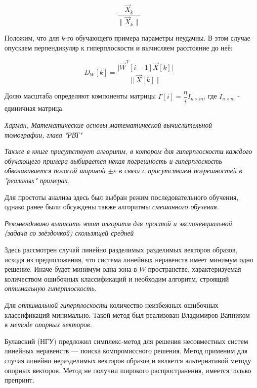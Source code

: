 \documentclass[a4paper]{article}
\numberwithin{equation}{subsection}
\begin{document}
\begin{equation}
    \dfrac{\vec{X}_k}{\| \vec{X}_k \|}
\end{equation}

Положим, что для $k$-го обучающего примера параметры неудачны. В этом случае опускаем перпендикуляр
к гиперплоскости и вычисляем расстояние до неё:

\begin{equation}
    D_W [k] = \dfrac{\lvert \vec{W}^T [i-1] \vec{X}[k] \rvert}{\| \vec{X}[k] \|}
\end{equation}

Долю масштаба определяют компоненты матрицы $\Gamma[i]=\dfrac{\eta}{i} I_{n\times m}$, где $I_{n \times m}$ - единичная матрица.

\begin{myquote}
    \textit{Харман, Математические основы математической вычислительной томографии, глава "РВТ"}
\end{myquote}

\begin{myquote}
    \textit{Также в книге присутствует алгоритм, в котором для гиперплоскости каждого обучающего 
    примера выбирается некая погрешность и гиперплоскость обволакивается полосой
    шириной $\pm \varepsilon$ в связи с присутствием погрешностей в "реальных" примерах.}
\end{myquote}

Для простоты анализа здесь был выбран режим последовательного обучения, однако ранее были обсуждены 
также алгоритмы
\textit{смешанного обучения}.

\begin{myquote}
    \textit{Рекомендовано выписать этот алгоритм для простой и экспоненциальной (задача со звёздочкой) 
    скользящей средней}
\end{myquote}

Здесь рассмотрен случай линейно разделимых разделимых векторов образов, исходя из предположения, что система 
линейных неравенств имеет минимум одно решение.
Иначе будет минимум одна зона в $W$-пространстве, характеризуемая количеством ошибочных классификаций 
и необходим алгоритм, строящий \textit{оптимальную гиперплоскость}.

Для \textit{оптимальной гиперплоскости} количество неизбежных ошибочных классификаций минимально. 
Такой метод был реализован Владимиров Вапником в \textit{методе опорных векторов}.

Булавский (НГУ) предложил симплекс-метод для решения несовместных систем линейных неравенств --- 
поиска компромиссного решения. 
Метод применим для случая линейно неразделимых векторов образов и является альтернативой методу 
опорных векторов. 
Метод не получил широкого распространения, имеется только препринт.
\end{document}
